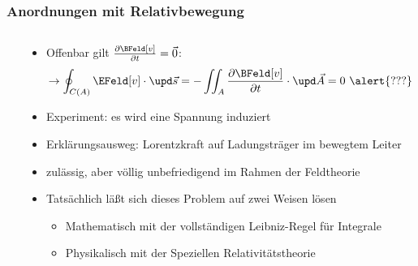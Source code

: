\begin{frame}
  \frametitle{Anordnungen mit Relativbewegung}
  \begin{columns}
    \begin{column}{.4\textwidth}
  \resizebox{\columnwidth}{!}{}
    \end{column}
    \begin{column}{.6\textwidth}
  \begin{itemize}[<+->]
  \item Offenbar gilt $\frac{\partial \BFeld[v]}{\partial t} = \vec{0}$:
    $$
    \to \oint_{C(A)} \EFeld[v]\cdot\upd\vec{s} = -\iint_{A} \frac{\partial \BFeld[v]}{\partial t} \cdot \upd \vec{A} = 0 \text{ \alert{???}}
    $$
  \item Experiment: \alert{es wird eine Spannung induziert}
  \item Erklärungsausweg: \alert{Lorentzkraft} auf Ladungsträger im bewegtem Leiter
  \item zulässig, aber völlig \alert{unbefriedigend} im Rahmen der Feldtheorie
  \item Tatsächlich läßt sich dieses Problem auf zwei Weisen lösen
    \begin{itemize}[<+->]
    \item \alert{Mathematisch} mit der vollständigen \alert{Leibniz-Regel für Integrale}
     \item \alert{Physikalisch} mit der \alert{Speziellen Relativitätstheorie}
      \end{itemize}
  \end{itemize}
      \end{column}
    \end{columns}
\end{frame}


